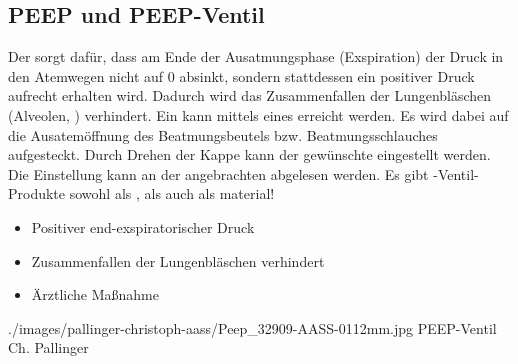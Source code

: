 \subsection{PEEP und PEEP-Ventil}
\label{topic:peep-ventil}


{%
Der  sorgt dafür, dass am Ende der Ausatmungsphase
(Exspiration) der Druck in den Atemwegen nicht auf 0
absinkt, sondern stattdessen ein positiver Druck aufrecht
erhalten wird. Dadurch wird das Zusammenfallen der
Lungenbläschen (Alveolen, )
verhindert.
Ein  kann mittels eines
 erreicht werden. Es wird dabei
auf die Ausatemöffnung des Beatmungsbeutels bzw.
Beatmungsschlauches aufgesteckt. Durch Drehen der Kappe kann
der gewünschte  eingestellt werden. Die
Einstellung kann an der angebrachten  abgelesen
werden.
Es gibt -Ventil-Produkte sowohl als ,
als auch als material!
}
{%
\begin{itemize}
  \item Positiver end-exspiratorischer Druck
  \item Zusammenfallen der
  Lungenbläschen verhindert
  \item Ärztliche Maßnahme
\end{itemize}
}
{./images/pallinger-christoph-aass/Peep_32909-AASS-0112mm.jpg}
{PEEP-Ventil}
{Ch. Pallinger}



\ChapterEnd


